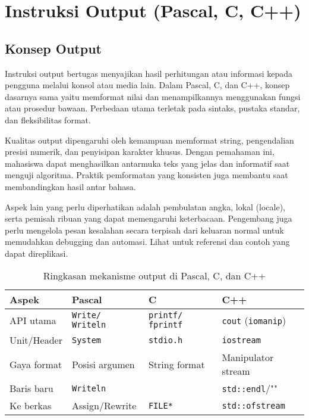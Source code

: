 \documentclass[../main.tex]{subfiles}
\begin{document}
\chapter{Instruksi Output (Pascal, C, C++)}
\section{Konsep Output}
Instruksi output bertugas menyajikan hasil perhitungan atau informasi kepada pengguna melalui konsol atau media lain. Dalam Pascal, C, dan C++, konsep dasarnya sama yaitu memformat nilai dan menampilkannya menggunakan fungsi atau prosedur bawaan. Perbedaan utama terletak pada sintaks, pustaka standar, dan fleksibilitas format.

Kualitas output dipengaruhi oleh kemampuan memformat string, pengendalian presisi numerik, dan penyisipan karakter khusus. Dengan pemahaman ini, mahasiswa dapat menghasilkan antarmuka teks yang jelas dan informatif saat menguji algoritma. Praktik pemformatan yang konsisten juga membantu saat membandingkan hasil antar bahasa.

Aspek lain yang perlu diperhatikan adalah pembulatan angka, lokal (locale), serta pemisah ribuan yang dapat memengaruhi keterbacaan. Pengembang juga perlu mengelola pesan kesalahan secara terpisah dari keluaran normal untuk memudahkan debugging dan automasi. Lihat \textcite{w3pascal-io,k&r-c-output-input,cplusplus-io} untuk referensi dan contoh yang dapat direplikasi.

\begin{table}[h]
  \centering
  \caption{Ringkasan mekanisme output di Pascal, C, dan C++}
  \label{tab:ringkasan-output}
  \begin{tabular}{@{}llll@{}}
    \toprule
    Aspek & Pascal & C & C++ \\
    \midrule
    API utama & \texttt{Write/\,Writeln} & \texttt{printf/\,fprintf} & \texttt{cout} (\texttt{iomanip}) \\
    Unit/Header & \texttt{System} & \texttt{stdio.h} & \texttt{iostream} \\
    Gaya format & Posisi argumen & String format & Manipulator stream \\
    Baris baru & \texttt{Writeln} & \texttt{\n} & \texttt{std::endl}/"\texttt{\n}" \\
    Ke berkas & Assign/Rewrite & \texttt{FILE*} & \texttt{std::ofstream} \\
    \bottomrule
  \end{tabular}
\end{table}
\end{document}
